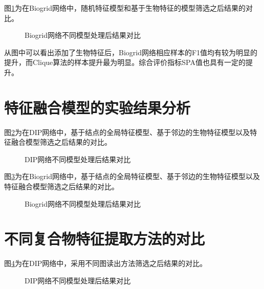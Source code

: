 图\ref{fig:result/Biogrid/edge}为在Biogrid网络中，随机特征模型和基于生物特征的模型筛选之后结果的对比。
\begin{figure}[htbp]
    \centering
    \vskip0.2cm
    \caption{Biogrid网络不同模型处理后结果对比}
    \label{fig:result/Biogrid/edge}
\end{figure}
从图中可以看出添加了生物特征后，Biogrid网络相应样本的F1值均有较为明显的提升，而Clique算法的样本提升最为明显。综合评价指标SPA值也具有一定的提升。


\section{特征融合模型的实验结果分析}
\label{section:fusionfeatAnasys}
图\ref{fig:result/DIP/fusion}为在DIP网络中，基于结点的全局特征模型、基于邻边的生物特征模型以及特征融合模型筛选之后结果的对比。
\begin{figure}[htbp]
    \centering
    \vskip0.2cm
    \caption{DIP网络不同模型处理后结果对比}
    \label{fig:result/DIP/fusion}
\end{figure}

图\ref{fig:result/Biogrid/fusion}为在Biogrid网络中，基于结点的全局特征模型、基于邻边的生物特征模型以及特征融合模型筛选之后结果的对比。
\begin{figure}[htbp]
    \centering
    \vskip0.2cm
    \caption{Biogrid网络不同模型处理后结果对比}
    \label{fig:result/Biogrid/fusion}
\end{figure}

\section{不同复合物特征提取方法的对比}
\label{section:gpoolAnasys}

图\ref{fig:result/DIP/readout}为在DIP网络中，采用不同图读出方法筛选之后结果的对比。
\begin{figure}[htbp]
    \centering
    \vskip0.2cm
    \caption{DIP网络不同模型处理后结果对比}
    \label{fig:result/DIP/readout}
\end{figure}

